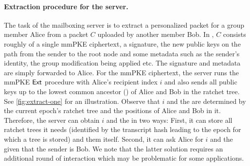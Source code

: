 \paragraph{Extraction procedure for the server.}
The task of the mailboxing server is to extract a personalized packet for a group member Alice from a packet $C$
uploaded by another member Bob. In \saik, $C$ consists roughly of a single mmPKE ciphertext, a signature, the new public
keys on the path from the sender to the root node and some metadata such as the sender's identity, the group
modification being applied etc. The signature and metadata are simply forwarded to Alice. For the mmPKE ciphertext, the
server runs the mmPKE ${\mathsf{Ext}}$ procedure with Alice's recipient index $i$ and also sends all public keys up to the
lowest common ancestor (\lca) of Alice and Bob in the ratchet tree. See \cref{fig:extract-one} for an illustration.
Observe that $i$ and the \lca are determined by the current epoch's ratchet tree and the positions of Alice and Bob in
it. Therefore, the server can obtain $i$ and the \lca in two ways: First, it can store all ratchet trees it needs
(identified by the transcript hash leading to the epoch for which a tree is stored) and them itself. Second, it can ask
Alice for $i$ and the \lca given that the sender is Bob. We note that the latter solution requires an additional round of interaction which may be problematic for some applications.
%
%

